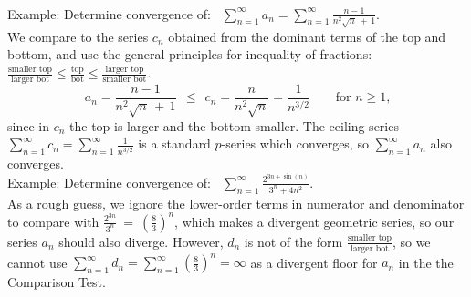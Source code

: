 \documentclass[11pt]{article}
\newcommand{\ds}{\displaystyle}
\begin{document}
\\[.5em]
{\sc Example:} Determine convergence of: \  
$ \ds\sum\limits_{n=1}^\infty a_n =\sum\limits_{n=1}^\infty \frac{n-1}{n^2\sqrt n \,+\,1}$.
\\
We compare to the series $c_n$ obtained from the dominant terms of the top and bottom,
and use the general principles for inequality of fractions:
$
\frac{\text{smaller top}}{\text{larger bot}} \leq \frac{\text{top}}{\text{bot}} \leq \frac{\text{larger top}}{\text{smaller bot}}.
$
$$
a_n=\frac{n-1}{n^2\sqrt n\,+\,1}
\ \ \leq\ \ c_n=\frac{n}{n^2\sqrt n}=\frac1{n^{3/2}}
\qquad\text{for $n\geq 1$,}
$$
since in $c_n$ the top is larger and the bottom smaller. 
The ceiling series $\sum_{n=1}^\infty c_n = \sum_{n=1}^\infty \frac1{n^{3/2}}$ 
is a standard $p$-series which converges, so $\sum_{n=1}^\infty a_n$ also converges.
\\[.5em]
{\sc Example:} Determine convergence of: \  
$\ds\sum\limits_{n=1}^\infty  \frac{2^{3n+\sin(n)}}{3^n + 4n^2}$.
\\
As a rough guess, we ignore the lower-order terms in numerator and denominator to compare with $\frac{2^{3n}}{3^n}
\ =\ \left(\frac{8}{3}\right)^{\!n}$, which makes a divergent geometric series, so our series $a_n$ should also diverge.
However, $d_n$ is not of the form $\frac{\text{smaller top}}{\text{larger bot}}$, so we cannot use 
$\sum_{n=1}^\infty d_n=\sum_{n=1}^\infty\left(\frac{8}{3}\right)^{\!n} = \infty$ 
as a divergent floor for $a_n$ in the the Comparison Test.
\end{document}
